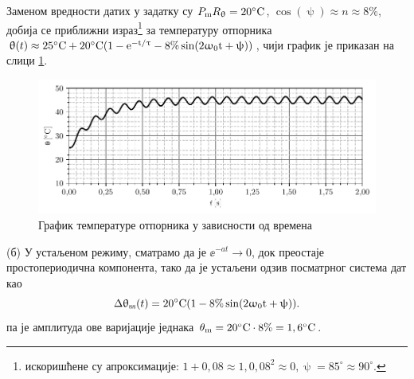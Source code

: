 Заменом вредности датих у задатку су 
${P_{\rm m} R_{\uptheta}} = 20^\circ\rm C$,
$\cos(\uppsi) \approx n \approx 8\%$, добија се приближни израз\footnote{
    искоришћене су апроксимације: $1 + 0,08\approx 1, 0,08^2 \approx 0, \uppsi = 85^\circ \approx 90^\circ$.
}
за температуру отпорника 
$
    \uptheta(t) \approx 25^\circ{\rm C} + 
    20^\circ\rm C( 1 - {\rm e}^{-t/\uptau} - 8\% \sin(2\upomega_0 t + \uppsi) )
$, чији график је приказан на слици \ref{fig:\ID.}.

\begin{figure}[!ht]
\centering
\includegraphics{fig/temperatura.pdf}
\caption{График температуре отпорника у зависности од времена}
\label{fig:\ID.}
\end{figure}

(б) У устаљеном режиму, сматрамо да је $\ee^{-at} \to 0$, док преостаје простопериодична компонента, тако да је 
устаљени одзив посматрног система дат као 
\begin{equation}
    \Delta\uptheta_{\rm ss}(t) =  20^\circ\rm C( 1 - 8\% \sin(2\upomega_0 t + \uppsi) ).
\end{equation}
па је амплитуда ове варијације једнака $\theta_{\rm m} = 20^\circ\rm C \cdot 8\% = 1,6^\circ\rm C$. 


